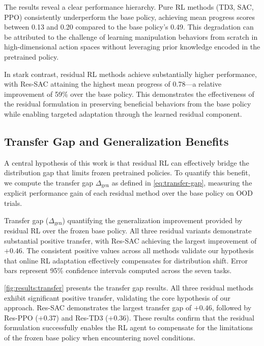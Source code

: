 The results reveal a clear performance hierarchy. Pure \ac{RL} methods (TD3, SAC, PPO) consistently underperform the base policy, achieving mean progress scores between 0.13 and 0.20 compared to the base policy's 0.49. This degradation can be attributed to the challenge of learning manipulation behaviors from scratch in high-dimensional action spaces without leveraging prior knowledge encoded in the pretrained policy.

In stark contrast, residual \ac{RL} methods achieve substantially higher performance, with Res-SAC attaining the highest mean progress of 0.78---a relative improvement of 59\% over the base policy. This demonstrates the effectiveness of the residual formulation in preserving beneficial behaviors from the base policy while enabling targeted adaptation through the learned residual component.

\subsection{Transfer Gap and Generalization Benefits}
\label{sec:results:transfer}

A central hypothesis of this work is that residual \ac{RL} can effectively bridge the distribution gap that limits frozen pretrained policies. To quantify this benefit, we compute the transfer gap $\Delta_{\text{gen}}$ as defined in \autoref{eq:transfer-gap}, measuring the explicit performance gain of each residual method over the base policy on \ac{OOD} trials.

{Transfer gap ($\Delta_{\text{gen}}$) quantifying the generalization improvement provided by residual \ac{RL} over the frozen base policy. All three residual variants demonstrate substantial positive transfer, with Res-SAC achieving the largest improvement of $+0.46$. The consistent positive values across all methods validate our hypothesis that online \ac{RL} adaptation effectively compensates for distribution shift. Error bars represent 95\% confidence intervals computed across the seven tasks.}

\autoref{fig:results:transfer} presents the transfer gap results. All three residual methods exhibit significant positive transfer, validating the core hypothesis of our approach. Res-SAC demonstrates the largest transfer gap of $+0.46$, followed by Res-PPO ($+0.37$) and Res-TD3 ($+0.36$). These results confirm that the residual formulation successfully enables the \ac{RL} agent to compensate for the limitations of the frozen base policy when encountering novel conditions.

